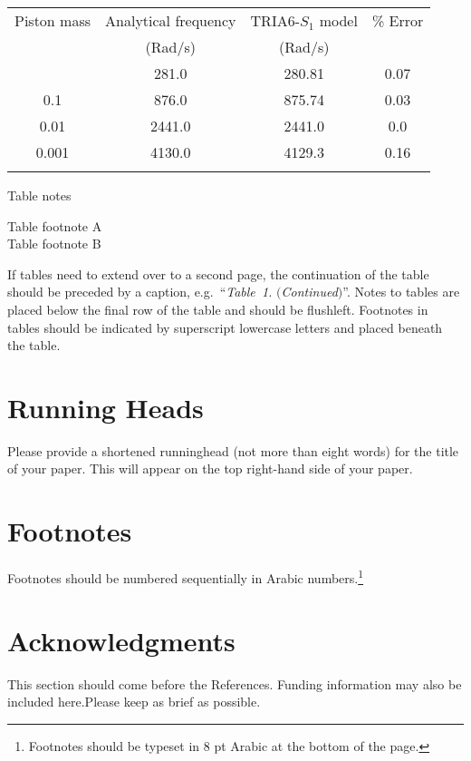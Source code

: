 \documentclass{IJCS_template}
\begin{document}
{\begin{table}[th]
{\begin{tabular}{@{}cccc@{}} \toprule
Piston mass & Analytical frequency & TRIA6-$S_1$ model &
\% Error \\
& (Rad/s) & (Rad/s) \\ \colrule
1.0\hphantom{00} & \hphantom{0}281.0 & \hphantom{0}280.81 & 0.07 \\
0.1\hphantom{00} & \hphantom{0}876.0 & \hphantom{0}875.74 & 0.03 \\
0.01\hphantom{0} & 2441.0 & 2441.0\hphantom{0} & 0.0\hphantom{0} \\
0.001 & 4130.0 & 4129.3\hphantom{0} & 0.16\\ \botrule
\end{tabular} }
\begin{tabnote}
Table notes
\end{tabnote}
\begin{tabfootnote}
 Table footnote A\\
 Table footnote B
\end{tabfootnote}
\end{table}

If tables need to extend over to a second page, the continuation of
the table should be preceded by a caption, e.g.~``{\it Table~1.}
$(${\it Continued}$)$''. Notes to tables are placed below the final
row of the table and should be flushleft.  Footnotes in tables
should be indicated by superscript lowercase letters and placed beneath
the table.

\section{Running Heads}
Please provide a shortened runninghead (not more than eight words) for
the title of your paper. This will appear on the top right-hand side
of your paper.

\section{Footnotes}
Footnotes should be numbered sequentially in Arabic
numbers.\footnote{Footnotes should be typeset in 8 pt Arabic at the
bottom of the page.}

\section*{Acknowledgments}
This section should come before the References. Funding information
may also be included here.Please keep as brief as possible.

}
\end{document}
